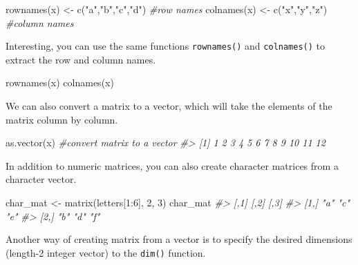 \documentclass[
]{book}
\newenvironment{Shaded}{\begin{snugshade}}{\end{snugshade}}
\newcommand{\CommentTok}[1]{\textcolor[rgb]{0.56,0.35,0.01}{\textit{#1}}}
\newcommand{\DecValTok}[1]{\textcolor[rgb]{0.00,0.00,0.81}{#1}}
\newcommand{\FunctionTok}[1]{\textcolor[rgb]{0.00,0.00,0.00}{#1}}
\newcommand{\NormalTok}[1]{#1}
\newcommand{\OtherTok}[1]{\textcolor[rgb]{0.56,0.35,0.01}{#1}}
\newcommand{\SpecialCharTok}[1]{\textcolor[rgb]{0.00,0.00,0.00}{#1}}
\newcommand{\StringTok}[1]{\textcolor[rgb]{0.31,0.60,0.02}{#1}}
\begin{document}
\begin{Shaded}
\begin{Highlighting}[]
\FunctionTok{rownames}\NormalTok{(x) }\OtherTok{\textless{}{-}} \FunctionTok{c}\NormalTok{(}\StringTok{"a"}\NormalTok{,}\StringTok{"b"}\NormalTok{,}\StringTok{"c"}\NormalTok{,}\StringTok{"d"}\NormalTok{)     }\CommentTok{\#row names}
\FunctionTok{colnames}\NormalTok{(x) }\OtherTok{\textless{}{-}} \FunctionTok{c}\NormalTok{(}\StringTok{"x"}\NormalTok{,}\StringTok{"y"}\NormalTok{,}\StringTok{"z"}\NormalTok{)         }\CommentTok{\#column names}
\end{Highlighting}
\end{Shaded}

Interesting, you can use the same functions \texttt{rownames()} and \texttt{colnames()} to extract the row and column names.

\begin{Shaded}
\begin{Highlighting}[]
\FunctionTok{rownames}\NormalTok{(x)}
\FunctionTok{colnames}\NormalTok{(x)}
\end{Highlighting}
\end{Shaded}

We can also convert a matrix to a vector, which will take the elements of the matrix column by column.

\begin{Shaded}
\begin{Highlighting}[]
\FunctionTok{as.vector}\NormalTok{(x)      }\CommentTok{\#convert matrix to a vector}
\CommentTok{\#\textgreater{}  [1]  1  2  3  4  5  6  7  8  9 10 11 12}
\end{Highlighting}
\end{Shaded}

In addition to numeric matrices, you can also create character matrices from a character vector.

\begin{Shaded}
\begin{Highlighting}[]
\NormalTok{char\_mat }\OtherTok{\textless{}{-}} \FunctionTok{matrix}\NormalTok{(letters[}\DecValTok{1}\SpecialCharTok{:}\DecValTok{6}\NormalTok{], }\DecValTok{2}\NormalTok{, }\DecValTok{3}\NormalTok{)}
\NormalTok{char\_mat}
\CommentTok{\#\textgreater{}      [,1] [,2] [,3]}
\CommentTok{\#\textgreater{} [1,] "a"  "c"  "e" }
\CommentTok{\#\textgreater{} [2,] "b"  "d"  "f"}
\end{Highlighting}
\end{Shaded}

Another way of creating matrix from a vector is to specify the desired dimensions (length-2 integer vector) to the \texttt{dim()} function.
\end{document}
